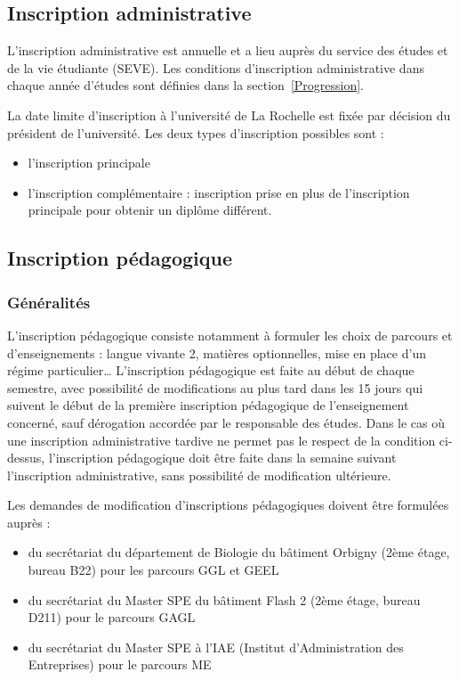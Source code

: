 \documentclass[a4paper,11pt]{article}
\begin{document}
\subsection{Inscription administrative}\label{InsciprtionAdministrative}

L'inscription administrative est annuelle et a lieu auprès du service des études et de la vie étudiante (SEVE). Les conditions d'inscription administrative dans chaque année d'études sont définies dans la section~\ref{Progression}.

La date limite d'inscription à l'université de La Rochelle est fixée par décision du président de l'université.
Les deux types d'inscription possibles sont :
\begin{itemize}
\item l'inscription principale
\item l'inscription complémentaire : inscription prise en plus de l'inscription principale pour obtenir un diplôme différent.
\end{itemize}


\subsection{Inscription pédagogique}\label{InscriptionPeda}

\subsubsection{Généralités}

L'inscription pédagogique consiste notamment à formuler les choix de parcours et d'enseignements : langue vivante 2, matières optionnelles, mise en place d'un régime particulier\ldots{} 
L'inscription pédagogique est faite au début de chaque semestre, avec possibilité de modifications au plus tard dans les 15 jours qui suivent le début de la première inscription pédagogique de l'enseignement concerné, sauf dérogation accordée par le responsable des études.
Dans le cas où une inscription administrative tardive ne permet pas le respect de la condition ci-dessus, l'inscription pédagogique doit être faite dans la semaine suivant l'inscription administrative, sans possibilité de modification ultérieure.

Les demandes de modification d'inscriptions pédagogiques doivent être formulées auprès :
\begin{itemize}
\item du secrétariat du département de Biologie du bâtiment Orbigny (2ème étage, bureau B22) pour les parcours GGL et GEEL
\item du secrétariat du Master SPE du bâtiment Flash 2 (2ème étage, bureau D211) pour le parcours GAGL
\item du secrétariat du Master SPE à l'IAE (Institut d'Administration des Entreprises) pour le parcours ME
\end{itemize}
\end{document}
